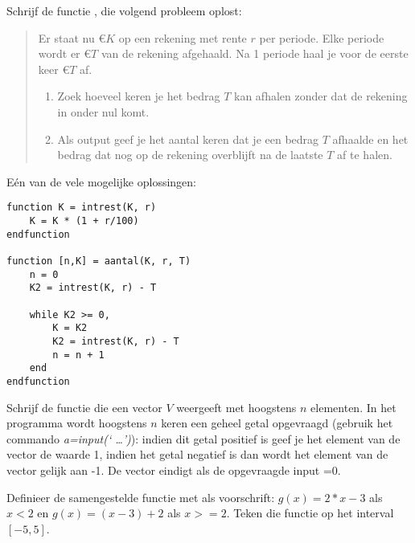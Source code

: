 \begin{oef}
Schrijf de functie , die volgend probleem oplost:
\begin{quote}
Er staat nu \euro $K$  op een rekening met  rente $r$  per periode.
Elke periode wordt er \euro ${T}$ van de  rekening afgehaald. 
Na 1 periode haal je voor de eerste keer \euro ${T}$ af.
\begin{enumerate}
    \item Zoek hoeveel keren je het bedrag $T$ kan afhalen zonder dat de rekening in onder nul komt.
    \item Als output geef je het aantal keren dat je een bedrag 
          $T$ afhaalde en het bedrag dat nog op de rekening overblijft na 
          de laatste $T$ af te halen.
\end{enumerate}  
\end{quote}
\begin{opl}E\'en van de vele mogelijke oplossingen:
\begin{lstlisting}
function K = intrest(K, r)
    K = K * (1 + r/100)
endfunction

function [n,K] = aantal(K, r, T)
    n = 0
    K2 = intrest(K, r) - T
    
    while K2 >= 0,
        K = K2
        K2 = intrest(K, r) - T
        n = n + 1
    end
endfunction
\end{lstlisting}
\end{opl}
\end{oef}

\begin{oef}
Schrijf de functie  die een vector $V$ 
weergeeft met hoogstens $n$ elementen. In het programma wordt hoogstens $n$ keren 
een geheel getal opgevraagd (gebruik het commando \emph{a=input(`  \ldots')}):
indien dit getal positief is geef je  het element van de vector de waarde 1, 
indien het getal negatief is dan wordt het element van de vector gelijk aan -1.
De vector eindigt als de opgevraagde input =0.
\end{oef}
\begin{oef}
Definieer de samengestelde functie  met
    als voorschrift:
$g(x)=2*x-3$ als $x<2$ en $g(x)=(x-3)+2$ als $x>=2$. 
Teken die functie op het
interval $[-5,5]$.
\end{oef}

